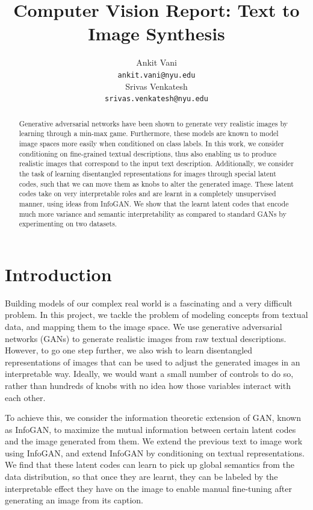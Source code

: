 \documentclass{article}
\title{Computer Vision Report: Text to Image Synthesis}
\author{
  Ankit Vani \\
  \texttt{ankit.vani@nyu.edu} \\
  \And
  Srivas Venkatesh \\
  \texttt{srivas.venkatesh@nyu.edu} \\
}
\begin{document}
\maketitle

\begin{abstract}
Generative adversarial networks have been shown to generate very realistic images by learning through a min-max game. Furthermore, these models are known to model image spaces more easily when conditioned on class labels. In this work, we consider conditioning on fine-grained textual descriptions, thus also enabling us to produce realistic images that correspond to the input text description. Additionally, we consider the task of learning disentangled representations for images through special latent codes, such that we can move them as knobs to alter the generated image. These latent codes take on very interpretable roles and are learnt in a completely unsupervised manner, using ideas from InfoGAN. We show that the learnt latent codes that encode much more variance and semantic interpretability as compared to standard GANs by experimenting on two datasets.
\end{abstract}


\section{Introduction}

Building models of our complex real world is a fascinating and a very difficult problem. In this project, we tackle the problem of modeling concepts from textual data, and mapping them to the image space. We use generative adversarial networks (GANs)\cite{gan} to generate realistic images from raw textual descriptions. However, to go one step further, we also wish to learn disentangled representations of images that can be used to adjust the generated images in an interpretable way. Ideally, we would want a small number of controls to do so, rather than hundreds of knobs with no idea how those variables interact with each other.

To achieve this, we consider the information theoretic extension of GAN, known as InfoGAN\cite{infogan}, to maximize the mutual information between certain latent codes and the image generated from them. We extend the previous text to image work \cite{text2image} using InfoGAN, and extend InfoGAN by conditioning on textual representations. We find that these latent codes can learn to pick up global semantics from the data distribution, so that once they are learnt, they can be labeled by the interpretable effect they have on the image to enable manual fine-tuning after generating an image from its caption.
\end{document}
